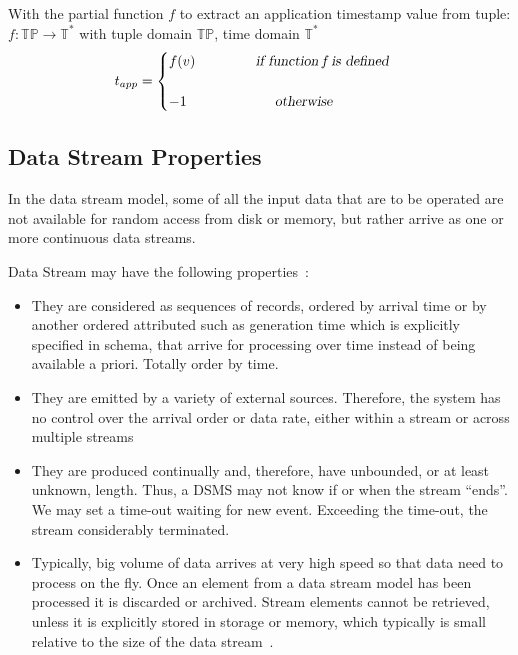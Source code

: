 With the partial function $f$ to extract an application timestamp value from tuple: $f: \mathbb{TP} \rightarrow \mathbb{T}^*$ with tuple domain $\mathbb{TP}$, time domain $\mathbb{T}^*$
\begin{equation}
	t_{app} = 
	\begin{cases}
		f(v) \qquad\qquad \textsl{ if function}\, f\, \textsl{is  defined}\\
		   \\
		-1 \qquad\qquad\qquad \textsl{ otherwise}
	\end{cases}
\end{equation}



 
\subsection*{Data Stream Properties} 
In the data stream model, some of all the input data that are to be operated are not available for random access from disk or memory, but rather arrive as one or more continuous data streams. 


Data Stream may have the following properties~\citep{Golab:2010}:
\begin{itemize}
	\item They are considered as sequences of records, ordered by arrival time or by another ordered attributed such as generation time which is explicitly specified in schema, that arrive for processing over time instead of being available a priori. Totally order by time. 
	\item They are emitted by a variety of external sources. Therefore, the system has no control over the arrival order or data rate, either within a stream or across multiple streams
	\item They are produced continually and, therefore, have unbounded, or at least unknown, length. Thus, a DSMS may not know if or when the stream ``ends''. We may set a time-out waiting for new event. Exceeding the time-out, the stream considerably terminated. 
	\item Typically, big volume of data arrives at very high speed so that data need to process on the fly. Once an element from a data stream model has been processed it is discarded or archived. Stream elements cannot be retrieved, unless it is explicitly stored in storage or memory, which typically is small relative to the size of the data stream~\citep{Babcock:2002}.
	
\end{itemize}


